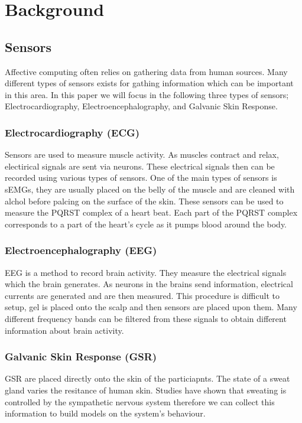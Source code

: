 \section{Background}
\label{sec:background}
\subsection{Sensors}
Affective computing often relies on gathering data from human sources.
Many different types of sensors exists for
gathing information which can be important in this area.
In this paper we will focus in the following three types of sensors;
Electrocardiography,
Electroencephalography,
and Galvanic Skin Response.

\subsubsection{Electrocardiography (ECG)}
Sensors are used to measure muscle activity.
As muscles contract and relax,
electirical signals are sent via neurons.
These electrical signals then
can be recorded using various types of sensors.
One of the main types of sensors is sEMGs,
they are usually placed on the belly of the muscle
and are cleaned with alchol before palcing
on the surface of the skin.
These sensors can be used to measure
the PQRST complex of a heart beat.
Each part of the PQRST complex
corresponds to a part of the heart's cycle as it pumps blood around the body.

\subsubsection{Electroencephalography (EEG)}
EEG is a method to record brain activity.
They measure the electrical signals which the brain generates.
As neurons in the brains send information,
electrical currents are generated and are then measured.
This procedure is difficult to setup,
gel is placed onto the scalp and then sensors are placed upon them.
Many different frequency bands can be filtered from these
signals to obtain different information about brain activity.

\subsubsection{Galvanic Skin Response (GSR)}
GSR are placed directly onto the skin of the particiapnts.
The state of a sweat gland varies the resitance of human skin.
Studies have shown that sweating is controlled by the sympathetic nervous system
therefore we can collect this information
to build models on the system's behaviour.


